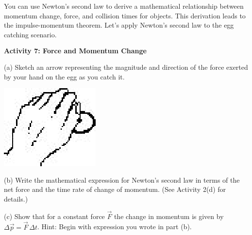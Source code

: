You can use Newton's second law to derive a mathematical relationship between
momentum change, force, and collision times for objects. This derivation leads
to the impulse-momentum theorem. Let's apply Newton's second law to the egg
catching scenario.

\textbf{Activity 7: Force and Momentum Change }

(a) Sketch an arrow representing the magnitude and direction of the force 
exerted by your hand on the egg as you catch it.

\vspace{0.3cm}
{\par\centering \includegraphics{momentum/momentum_fig3.eps} \par}
\vspace{0.3cm}

(b) Write the mathematical expression for Newton's second law in terms of the
net force and the time rate of change of momentum. (See Activity 2(d) for 
details.)
\vspace{20mm}


(c) Show that for a constant force \( {\vec F} \) the change in momentum
is given by \( \Delta {\vec p}={\vec F}\,\Delta t\).  Hint: Begin with expression 
you wrote in part (b).

